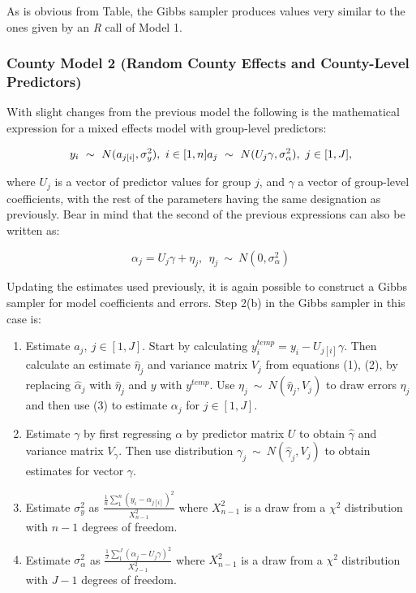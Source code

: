 \documentclass[]{article}
\begin{document}
As is obvious from Table, the Gibbs sampler produces values very similar
to the ones given by an \textit{R} call of Model 1.

\subsubsection{County Model 2 (Random County Effects and County-Level
Predictors)}\label{county-model-2-random-county-effects-and-county-level-predictors}

With slight changes from the previous model the following is the
mathematical expression for a mixed effects model with group-level
predictors:

\[y_i \ \sim \ N(a_{j[i]}, \sigma^2_y),\ i \in [1, n] \\ a_j \ \sim \ N(U_j\gamma, \sigma^2_{\alpha}), \ j \in [1,J], \]

where \(U_j\) is a vector of predictor values for group \(j\), and
\(\gamma\) a vector of group-level coefficients, with the rest of the
parameters having the same designation as previously. Bear in mind that
the second of the previous expressions can also be written as:

\begin{equation}
\alpha_j = U_j\gamma + \eta_j, \ \ \eta_j \ \sim \ N(0, \sigma_{\alpha}^2)
\end{equation}

Updating the estimates used previously, it is again possible to
construct a Gibbs sampler for model coefficients and errors. Step 2(b)
in the Gibbs sampler in this case is:

\begin{enumerate}
  \item Estimate $a_j, \ j\in[1,J]$. Start by calculating $y_i^{temp} = y_i - U_{j[i]}\gamma$. Then calculate an estimate $\hat\eta_j$ and variance matrix $V_j$ from equations (1), (2), by replacing $\hat\alpha_j$ with $\hat\eta_j$ and $y$ with $y^{temp}$. Use $\eta_j \ \sim \ N(\hat\eta_j, V_j)$ to draw errors $\eta_j$ and then use (3) to estimate $\alpha_j$ for $j \in [1,J]$.
  \item Estimate $\gamma$ by first regressing $\alpha$ by predictor matrix $U$ to obtain $\hat\gamma$ and variance matrix $V_{\gamma}$. Then use distribution $\gamma_j \ \sim \ N(\hat\gamma_j, V_j)$ to obtain estimates for vector $\gamma$.
  \item Estimate $\sigma_y^2$ as $\frac{\frac{1}{n}\sum_{1}^{n}(y_i - \alpha_{j[i]})^2}{X_{n-1}^2}$ where $X_{n-1}^2$ is a draw from a $\chi^2$ distribution with $n-1$ degrees of freedom.
  \item Estimate $\sigma_{\alpha}^2$ as $\frac{\frac{1}{J}\sum_{1}^{J}(\alpha_j - U_j\gamma)^2}{X_{J-1}^2}$ where $X_{n-1}^2$ is a draw from a $\chi^2$ distribution with $J-1$ degrees of freedom.
\end{enumerate}
\end{document}
